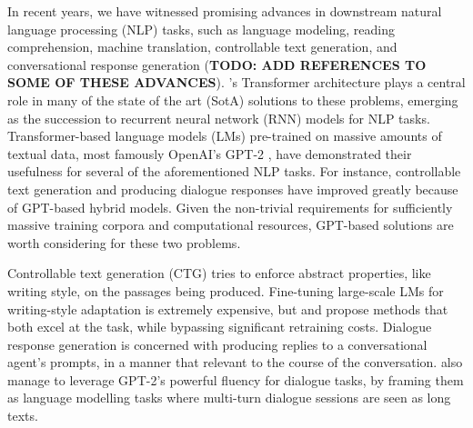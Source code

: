 

 

In recent years, we have witnessed promising advances in downstream natural language processing (NLP) tasks, such as language modeling, reading comprehension, machine translation, controllable text generation, and conversational response generation (\textbf{TODO: ADD REFERENCES TO SOME OF THESE ADVANCES}). \citeauthor{vaswani2017attention}'s Transformer architecture plays a central role in many of the state of the art (SotA) solutions to these problems, emerging as the succession to recurrent neural network (RNN) models for NLP tasks. Transformer-based language models (LMs) pre-trained on massive amounts of textual data, most famously OpenAI's GPT-2 \citep{radford2019language}, have demonstrated their usefulness for several of the aforementioned NLP tasks. For instance, controllable text generation and producing dialogue responses have improved greatly because of GPT-based hybrid models. Given the non-trivial requirements for sufficiently massive training corpora and computational resources, GPT-based solutions are worth considering for these two problems.

Controllable text generation (CTG) tries to enforce abstract properties, like writing style, on the passages being produced. Fine-tuning large-scale LMs for writing-style adaptation is extremely expensive, but \cite{dathathri2019plug} and \cite{li-etal-2020-optimus} propose methods that both excel at the task, while bypassing significant retraining costs. Dialogue response generation is concerned with producing replies to a conversational agent's prompts, in a manner that relevant to the course of the conversation. \cite{zhang2019dialogpt} also manage to leverage GPT-2's powerful fluency for dialogue tasks, by framing them as language modelling tasks where multi-turn dialogue sessions are seen as long texts.

